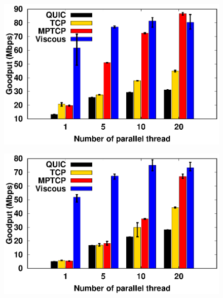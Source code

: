 \begin{figure}[!t]
    \begin{center}
        \begin{minipage}{0.45\linewidth}
            \centering
            \includegraphics[width=\linewidth]{img/exp6/goodput_1}
            \label{fig:exp6_goodput_16}
        \end{minipage}
        \begin{minipage}{0.45\linewidth}
            \centering
            \includegraphics[width=\linewidth]{img/exp6/goodput_5}
            \label{fig:exp6_goodput_80}
        \end{minipage}
        \begin{minipage}{0.45\linewidth}
            \centering

\end{minipage}
\end{center}
\end{figure}
